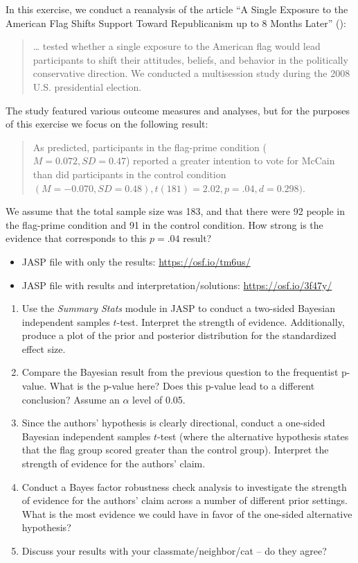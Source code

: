 \documentclass[
]{book}
\providecommand{\tightlist}{%
  \setlength{\itemsep}{0pt}\setlength{\parskip}{0pt}}
\begin{document}
In this exercise, we conduct a reanalysis of the article ``A Single Exposure to the American Flag Shifts Support Toward Republicanism up to 8 Months Later'' (\citet{CarterEtAl2011}):

\begin{quote}
\ldots{} tested whether a single exposure to the American flag would lead participants to shift their attitudes, beliefs, and behavior in the politically conservative direction. We conducted a multisession study during the 2008 U.S. presidential election.
\end{quote}

The study featured various outcome measures and analyses, but for the purposes of this exercise we focus on the following result:

\begin{quote}
As predicted, participants in the flag-prime condition (\(M = 0.072, SD = 0.47\)) reported a greater intention to vote for McCain than did participants in the control condition \((M = -0.070, SD = 0.48), t(181) = 2.02, p = .04, d = 0.298)\).
\end{quote}

We assume that the total sample size was 183, and that there were 92 people in the flag-prime condition and 91 in the control condition. How strong is the evidence that corresponds to this \(p=.04\) result?

\begin{itemize}
\tightlist
\item
  JASP file with only the results: \url{https://osf.io/tm6us/}
\item
  JASP file with results and interpretation/solutions: \url{https://osf.io/3f47y/}
\end{itemize}

\begin{enumerate}
\def\labelenumi{\arabic{enumi}.}
\tightlist
\item
  Use the \emph{Summary Stats} module in JASP to conduct a two-sided Bayesian independent samples \(t\)-test. Interpret the strength of evidence. Additionally, produce a plot of the prior and posterior distribution for the standardized effect size.
\item
  Compare the Bayesian result from the previous question to the frequentist p-value. What is the p-value here? Does this p-value lead to a different conclusion? Assume an \(\alpha\) level of 0.05.
\item
  Since the authors' hypothesis is clearly directional, conduct a one-sided Bayesian independent samples \(t\)-test (where the alternative hypothesis states that the flag group scored greater than the control group). Interpret the strength of evidence for the authors' claim.
\item
  Conduct a Bayes factor robustness check analysis to investigate the strength of evidence for the authors' claim across a number of different prior settings. What is the most evidence we could have in favor of the one-sided alternative hypothesis?
\item
  Discuss your results with your classmate/neighbor/cat -- do they agree?
\end{enumerate}

  
\end{document}
